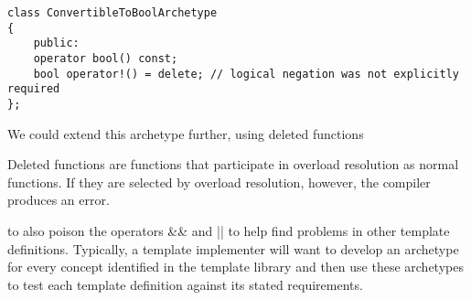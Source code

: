 \begin{lstlisting}[style=styleCXX]
class ConvertibleToBoolArchetype
{
	public:
	operator bool() const;
	bool operator!() = delete; // logical negation was not explicitly required
};
\end{lstlisting}

We could extend this archetype further, using deleted functions

\begin{tcolorbox}[colback=webgreen!5!white,colframe=webgreen!75!black]
\hspace*{0.75cm}Deleted functions are functions that participate in overload resolution as normal functions. If they are selected by overload resolution, however, the compiler produces an error.
\end{tcolorbox}

to also poison the operators \&\& and || to help find problems in other template definitions. Typically, a template implementer will want to develop an archetype for every concept identified in the template library and then use these archetypes to test each template definition against its stated requirements.






















